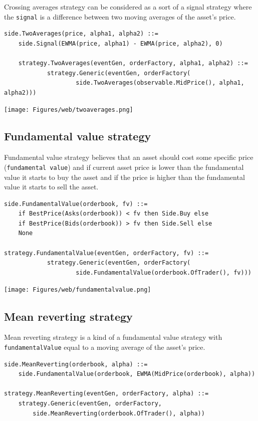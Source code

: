 \documentclass[a4paper,11pt]{article}
\begin{document}
Crossing averages strategy can be considered as a sort of a signal
strategy where the \texttt{signal} is a difference between two moving
averages of the asset's price.

\begin{verbatim}
side.TwoAverages(price, alpha1, alpha2) ::=
    side.Signal(EWMA(price, alpha1) - EWMA(price, alpha2), 0)

    strategy.TwoAverages(eventGen, orderFactory, alpha1, alpha2) ::=
            strategy.Generic(eventGen, orderFactory(
                    side.TwoAverages(observable.MidPrice(), alpha1, alpha2)))
\end{verbatim}

\centerline{\texttt{[image: Figures/web/twoaverages.png]}}

\subsection{Fundamental value
strategy}\label{fundamental-value-strategy}

Fundamental value strategy believes that an asset should cost some
specific price (\texttt{fundamental value}) and if current asset price
is lower than the fundamental value it starts to buy the asset and if
the price is higher than the fundamental value it starts to sell the
asset.

\begin{verbatim}
side.FundamentalValue(orderbook, fv) ::=
    if BestPrice(Asks(orderbook)) < fv then Side.Buy else
    if BestPrice(Bids(orderbook)) > fv then Side.Sell else
    None

strategy.FundamentalValue(eventGen, orderFactory, fv) ::=
            strategy.Generic(eventGen, orderFactory(
                    side.FundamentalValue(orderbook.OfTrader(), fv)))
\end{verbatim}

\centerline{\texttt{[image: Figures/web/fundamentalvalue.png]}}

\subsection{Mean reverting strategy}\label{mean-reverting-strategy}

Mean reverting strategy is a kind of a fundamental value strategy with
\texttt{fundamentalValue} equal to a moving average of the asset's
price.

\begin{verbatim}
side.MeanReverting(orderbook, alpha) ::=
    side.FundamentalValue(orderbook, EWMA(MidPrice(orderbook), alpha))

strategy.MeanReverting(eventGen, orderFactory, alpha) ::=
    strategy.Generic(eventGen, orderFactory,
        side.MeanReverting(orderbook.OfTrader(), alpha))
\end{verbatim}
\end{document}
